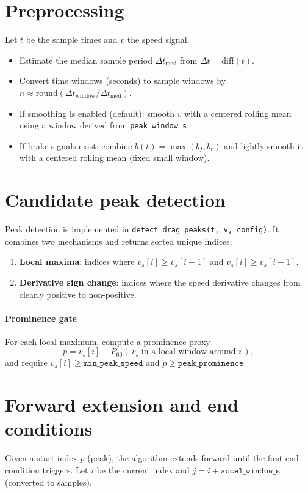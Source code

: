 \documentclass[11pt,a4paper]{article}
\begin{document}
\section{Preprocessing}
Let $t$ be the sample times and $v$ the speed signal.
\begin{itemize}
  \item Estimate the median sample period $\Delta t_\mathrm{med}$ from $\Delta t = \mathrm{diff}(t)$.
  \item Convert time windows (seconds) to sample windows by $n \approx \mathrm{round}(\Delta t_\mathrm{window}/\Delta t_\mathrm{med})$.
  \item If smoothing is enabled (default): smooth $v$ with a centered rolling mean using a window derived from \texttt{peak\_window\_s}.
  \item If brake signals exist: combine $b(t)=\max(b_f,b_r)$ and lightly smooth it with a centered rolling mean (fixed small window).
\end{itemize}

\section{Candidate peak detection}
Peak detection is implemented in \texttt{detect\_drag\_peaks(t, v, config)}.
It combines two mechanisms and returns sorted unique indices:
\begin{enumerate}
  \item \textbf{Local maxima}: indices where $v_s[i] \ge v_s[i-1]$ and $v_s[i] \ge v_s[i+1]$.
  \item \textbf{Derivative sign change}: indices where the speed derivative changes from clearly positive to non-positive.
\end{enumerate}

\paragraph{Prominence gate}
For each local maximum, compute a prominence proxy
\[
  p = v_s[i] - P_{60}(\,v_s\;\text{in a local window around }i\,),
\]
and require $v_s[i] \ge \texttt{min\_peak\_speed}$ and $p \ge \texttt{peak\_prominence}$.

\section{Forward extension and end conditions}
Given a start index $p$ (peak), the algorithm extends forward until the first end condition triggers.
Let $i$ be the current index and $j=i+\texttt{accel\_window\_s}$ (converted to samples).
\end{document}
